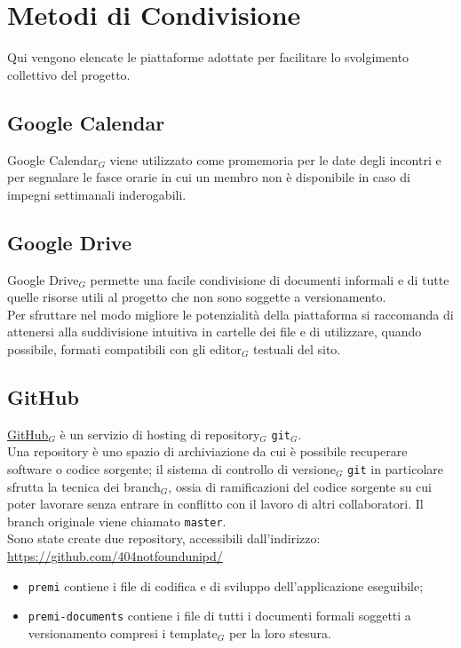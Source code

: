 \section{Metodi di Condivisione}

Qui vengono elencate le piattaforme adottate per facilitare lo svolgimento collettivo del progetto. \\

\subsection{Google Calendar}
Google Calendar$_{G}$ viene utilizzato come promemoria per le date degli incontri e per segnalare le fasce orarie in cui un membro non è disponibile in caso di impegni settimanali inderogabili. \\

\subsection{Google Drive}
Google Drive$_{G}$ permette una facile condivisione di documenti informali e di tutte quelle risorse utili al progetto che non sono soggette a versionamento. \\
Per sfruttare nel modo migliore le potenzialità della piattaforma si raccomanda di attenersi alla suddivisione intuitiva in cartelle dei file e di utilizzare, quando possibile, formati compatibili con gli editor$_{G}$ testuali del sito.

\subsection{GitHub}
\href{http://www.github.com/}{GitHub}$_{G}$ è un servizio di hosting di repository$_{G}$ \texttt{git}$_{G}$. \\
Una repository è uno spazio di archiviazione da cui è possibile recuperare software o codice sorgente; il sistema di controllo di versione$_{G}$ \texttt{git} in particolare sfrutta la tecnica dei branch$_{G}$, ossia di ramificazioni del codice sorgente su cui poter lavorare senza  entrare in conflitto con il lavoro di altri collaboratori. Il branch originale viene chiamato \texttt{master}. \\
Sono state create due repository, accessibili dall'indirizzo:\\ 
\url{https://github.com/404notfoundunipd/}
\begin{itemize}
\item \texttt{premi} contiene i file di codifica e di sviluppo dell'applicazione eseguibile;
\item \texttt{premi-documents} contiene i file di tutti i documenti formali soggetti a versionamento compresi i template$_{G}$ per la loro stesura.
\end{itemize}


